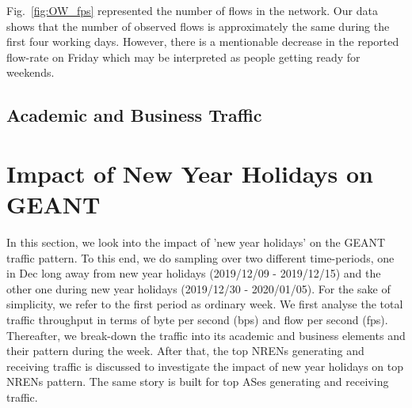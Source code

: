 \documentclass[10pt, journal, letterpaper]{IEEEtran}
\begin{document}
Fig.~\ref{fig:OW_fps} represented the number of flows in the network. Our data shows that the number of observed flows is approximately the same during the first four working days. However, there is a mentionable decrease in the reported flow-rate on Friday which may be interpreted as people getting ready for weekends.

\subsection{Academic and Business Traffic}

\section{Impact of New Year Holidays on GEANT}
In this section, we look into the impact of 'new year holidays' on the GEANT traffic pattern. To this end, we do sampling over two different time-periods, one in Dec long away from new year holidays (2019/12/09 - 2019/12/15) and the other one during new year holidays (2019/12/30 - 2020/01/05). For the sake of simplicity, we refer to the first period as ordinary week. We first analyse the total traffic throughput in terms of byte per second (bps) and flow per second (fps). Thereafter, we break-down the traffic into its academic and business elements and their pattern during the week. After that, the top NRENs generating and receiving traffic is discussed to investigate the impact of new year holidays on top NRENs pattern. The same story is built for top ASes generating and receiving traffic.
\end{document}
